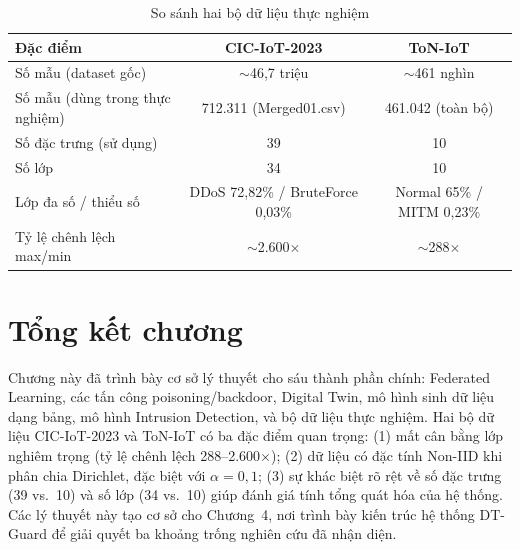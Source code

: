 \begin{table}[H]
\centering
\caption{So sánh hai bộ dữ liệu thực nghiệm}
\label{tab:dataset_comparison}
\small
\begin{tabular}{|l|c|c|}
\hline
\textbf{Đặc điểm} & \textbf{CIC-IoT-2023} & \textbf{ToN-IoT} \\
\hline
Số mẫu (dataset gốc) & $\sim$46,7 triệu & $\sim$461 nghìn \\
\hline
Số mẫu (dùng trong thực nghiệm) & 712.311 (Merged01.csv) & 461.042 (toàn bộ) \\
\hline
Số đặc trưng (sử dụng) & 39 & 10 \\
\hline
Số lớp & 34 & 10 \\
\hline
Lớp đa số / thiểu số & DDoS 72,82\% / BruteForce 0,03\% & Normal 65\% / MITM 0,23\% \\
\hline
Tỷ lệ chênh lệch max/min & $\sim$2.600$\times$ & $\sim$288$\times$ \\
\hline
\end{tabular}
\end{table}

\section{Tổng kết chương}
Chương này đã trình bày cơ sở lý thuyết cho sáu thành phần chính: Federated Learning, các tấn công poisoning/backdoor, Digital Twin, mô hình sinh dữ liệu dạng bảng, mô hình Intrusion Detection, và bộ dữ liệu thực nghiệm. Hai bộ dữ liệu CIC-IoT-2023 và ToN-IoT có ba đặc điểm quan trọng: (1) mất cân bằng lớp nghiêm trọng (tỷ lệ chênh lệch 288--2.600$\times$); (2) dữ liệu có đặc tính Non-IID khi phân chia Dirichlet, đặc biệt với $\alpha=0{,}1$; (3) sự khác biệt rõ rệt về số đặc trưng (39 vs.\ 10) và số lớp (34 vs.\ 10) giúp đánh giá tính tổng quát hóa của hệ thống. Các lý thuyết này tạo cơ sở cho Chương~4, nơi trình bày kiến trúc hệ thống DT-Guard để giải quyết ba khoảng trống nghiên cứu đã nhận diện.

